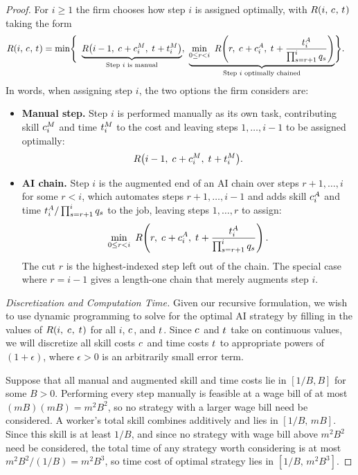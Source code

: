 \begin{proof}
For $i \ge 1$ the firm chooses how step $i$ is assigned optimally, with $R(i,\, c_{},\, t_{})$ taking the form
\begin{align*}
R(i,\, \skillcost{},\, \timecost{}) = \min\Biggl\{
& \ \underbrace{R\bigl(i-1,\; \skillcost{} + \manualSkill{i},\; \timecost{} + \manualTime{i}\bigr)}_{\text{Step $i$ is manual}}, \ \underbrace{\min_{0 \le r < i}\ R\!\left(r,\; \skillcost{} + \AIskill{i},\; \timecost{} + \frac{\AItime{i}}{\prod_{s=r+1}^{i} q_s}\right)}_{\text{Step $i$ optimally chained}}
\Biggr\}.
\end{align*}
In words, when assigning step $i$, the two options the firm considers are:
\begin{itemize}
\item \textbf{Manual step.}
Step $i$ is performed manually as its own task, contributing skill $c^{M}_{i}$ and time $t^{M}_{i}$ to the cost and leaving steps $1, \dotsc, i-1$ to be assigned optimally:
\[
R\bigl(i-1,\; c_{} + c^{M}_{i},\; t_{} + t^{M}_{i}\bigr).
\]
\item \textbf{AI chain.}
Step $i$ is the augmented end of an AI chain over steps $r+1, \dotsc, i$ for some $r < i$, which automates steps $r+1, \dotsc, i-1$ and adds skill $c^{A}_{i}$ and time $t^{A}_{i}/\prod_{s=r+1}^{i} q_s$ to the job, leaving steps $1, \dotsc, r$ to assign:
\[
\min_{0 \le r < i}\ R\!\left(r,\; \skillcost{} + \AIskill{i},\; \timecost{} + \frac{\AItime{i}}{\prod_{s=r+1}^{i} q_s}\right).
\]
The cut $r$ is the highest-indexed step left out of the chain.
The special case where $r = i-1$ gives a length-one chain that merely augments step $i$.
\end{itemize}


\emph{Discretization and Computation Time.}
Given our recursive formulation, we wish to use dynamic programming to solve for the optimal AI strategy by filling in the values of $R(i,\; c_{},\; t_{})$ for all $i$, $c_{}$, and $t_{}$.
Since $c_{}$ and $t_{}$ take on continuous values, we will discretize all skill costs $c_{}$ and time costs $t_{}$ to appropriate powers of $(1+\epsilon)$, where $\epsilon > 0$ is an arbitrarily small error term.

Suppose that all manual and augmented skill and time costs lie in $[1/B, B]$ for some $B > 0$.
Performing every step manually is feasible at a wage bill of at most $(mB)(mB) = m^2 B^2$, so no strategy with a larger wage bill need be considered.
A worker's total skill combines additively and lies in $[1/B,\, mB]$.
Since this skill is at least $1/B$, and since no strategy with wage bill above $m^2 B^2$ need be considered, the total time of any strategy worth considering is at most $m^2 B^2/(1/B) = m^2 B^3$, so time cost of optimal strategy lies in $[1/B,\, m^2 B^3]$.



\end{proof}
